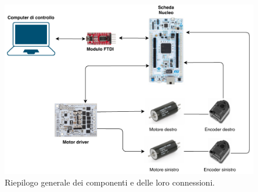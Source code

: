\begin{figure}[H]
\centering
\includegraphics[scale=0.9]{images/infrastruttura.pdf}
\caption{Riepilogo generale dei componenti e delle loro connessioni.}
\end{figure}
